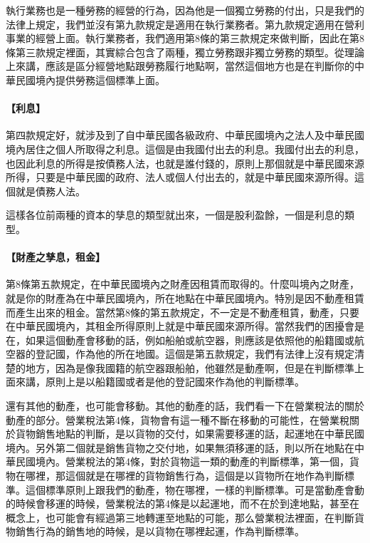 \documentclass[oneside,sub3section]{ctexbook}
\let\oldparagraph\paragraph
\renewcommand{\paragraph}[1]{\oldparagraph{#1}\mbox{}}
\begin{document}
執行業務也是一種勞務的經營的行為，因為他是一個獨立勞務的付出，只是我們的法律上規定，我們並沒有第九款規定是適用在執行業務者。第九款規定適用在營利事業的經營上面。執行業務者，我們適用第8條的第三款規定來做判斷，因此在第8條第三款規定裡面，其實綜合包含了兩種，獨立勞務跟非獨立勞務的類型。從理論上來講，應該是區分經營地點跟勞務履行地點啊，當然這個地方也是在判斷你的中華民國境內提供勞務這個標準上面。

\hypertarget{ux5229ux606f}{%
\paragraph{【利息】}\label{ux5229ux606f}}

第四款規定好，就涉及到了自中華民國各級政府、中華民國境內之法人及中華民國境內居住之個人所取得之利息。這個是由我國付出去的利息。我國付出去的利息，也因此利息的所得是按債務人法，也就是誰付錢的，原則上那個就是中華民國來源所得，只要是中華民國的政府、法人或個人付出去的，就是中華民國來源所得。這個就是債務人法。

這樣各位前兩種的資本的孳息的類型就出來，一個是股利盈餘，一個是利息的類型。

\hypertarget{ux8ca1ux7522ux4e4bux5b73ux606fux79dfux91d1}{%
\paragraph{【財產之孳息，租金】}\label{ux8ca1ux7522ux4e4bux5b73ux606fux79dfux91d1}}

第8條第五款規定，在中華民國境內之財產因租賃而取得的。什麼叫境內之財產，就是你的財產為在中華民國境內，所在地點在中華民國境內。特別是因不動產租賃而產生出來的租金。當然第8條的第五款規定，不一定是不動產租賃，動產，只要在中華民國境內，其租金所得原則上就是中華民國來源所得。當然我們的困擾會是在，如果這個動產會移動的話，例如船舶或航空器，則應該是依照他的船籍國或航空器的登記國，作為他的所在地國。這個是第五款規定，我們有法律上沒有規定清楚的地方，因為是像我國籍的航空器跟船舶，他雖然是動產啊，但是在判斷標準上面來講，原則上是以船籍國或者是他的登記國來作為他的判斷標準。

還有其他的動產，也可能會移動。其他的動產的話，我們看一下在營業稅法的關於動產的部分。營業稅法第4條，貨物會有這一種不斷在移動的可能性，在營業稅關於貨物銷售地點的判斷，是以貨物的交付，如果需要移運的話，起運地在中華民國境內。另外第二個就是銷售貨物之交付地，如果無須移運的話，則以所在地點在中華民國境內。營業稅法的第4條，對於貨物這一類的動產的判斷標準，第一個，貨物在哪裡，那這個就是在哪裡的貨物銷售行為，這個是以貨物所在地作為判斷標準。這個標準原則上跟我們的動產，物在哪裡，一樣的判斷標準。可是當動產會動的時候會移運的時候，營業稅法的第4條是以起運地，而不在於到達地點，甚至在概念上，也可能會有經過第三地轉運至地點的可能，那么營業稅法裡面，在判斷貨物銷售行為的銷售地的時候，是以貨物在哪裡起運，作為判斷標準。
\end{document}
